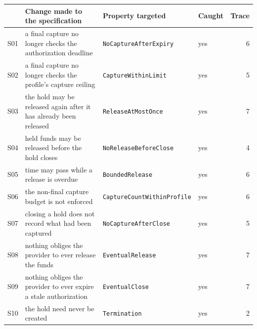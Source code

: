 \begin{tabular}{llllr}
\toprule
& Change made to the specification & Property targeted & Caught & Trace \\
\midrule
S01 & a final capture no longer checks the authorization deadline & \texttt{NoCaptureAfterExpiry} & yes & 6 \\
S02 & a final capture no longer checks the profile's capture ceiling & \texttt{CaptureWithinLimit} & yes & 5 \\
S03 & the hold may be released again after it has already been released & \texttt{ReleaseAtMostOnce} & yes & 7 \\
S04 & held funds may be released before the hold closes & \texttt{NoReleaseBeforeClose} & yes & 4 \\
S05 & time may pass while a release is overdue & \texttt{BoundedRelease} & yes & 6 \\
S06 & the non-final capture budget is not enforced & \texttt{CaptureCountWithinProfile} & yes & 6 \\
S07 & closing a hold does not record what had been captured & \texttt{NoCaptureAfterClose} & yes & 5 \\
S08 & nothing obliges the provider to ever release the funds & \texttt{EventualRelease} & yes & 7 \\
S09 & nothing obliges the provider to ever expire a stale authorization & \texttt{EventualClose} & yes & 7 \\
S10 & the hold need never be created & \texttt{Termination} & yes & 2 \\
\bottomrule
\end{tabular}
